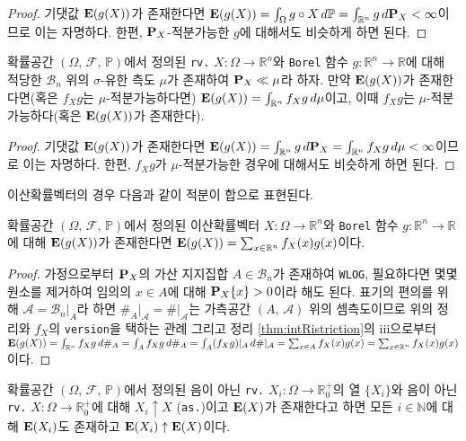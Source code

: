\begin{proof}
    기댓값 $\mathbf{E}(g(X))$가 존재한다면 $\mathbf{E}(g(X))=\int_\Omega g\circ X\,d\mathbb{P}=\int_{\mathbb{R}^n}g\,d\mathbf{P}_X<\infty$이므로 이는 자명하다. 한편, $\mathbf{P}_X$-적분가능한 $g$에 대해서도 비슷하게 하면 된다.
\end{proof}

\begin{theorem}
    확률공간 $(\Omega,\,\mathcal{F},\,\mathbb{P})$에서 정의된 \texttt{rv.} $X:\Omega\to\mathbb{R}^n$와 \texttt{Borel} 함수 $g:\mathbb{R}^n\to\mathbb{R}$에 대해 적당한 $\mathcal{B}_n$ 위의 $\sigma$-유한 측도 $\mu$가 존재하여 $\mathbf{P}_X\ll\mu$라 하자. 만약 $\mathbf{E}(g(X))$가 존재한다면(혹은 $f_Xg$는 $\mu$-적분가능하다면) $\mathbf{E}(g(X))=\int_{\mathbb{R}^n}f_Xg\,d\mu$이고, 이때 $f_Xg$는 $\mu$-적분가능하다(혹은 $\mathbf{E}(g(X))$가 존재한다).
\end{theorem}

\begin{proof}
    기댓값 $\mathbf{E}(g(X))$가 존재한다면 $\mathbf{E}(g(X))=\int_{\mathbb{R}^n}g\,d\mathbf{P}_X=\int_{\mathbb{R}^n}f_Xg\,d\mu<\infty$이므로 이는 자명하다. 한편, $f_Xg$가 $\mu$-적분가능한 경우에 대해서도 비슷하게 하면 된다.
\end{proof}

이산확률벡터의 경우 다음과 같이 적분이 합으로 표현된다.

\begin{corollary}
    확률공간 $(\Omega,\,\mathcal{F},\,\mathbb{P})$에서 정의된 이산확률벡터 $X:\Omega\to\mathbb{R}^n$와 \texttt{Borel} 함수 $g:\mathbb{R}^n\to\mathbb{R}$에 대해 $\mathbf{E}(g(X))$가 존재한다면 $\mathbf{E}(g(X))=\sum_{x\in\mathbb{R}^n}f_X(x)g(x)$이다.
\end{corollary}

\begin{proof}
    가정으로부터 $\mathbf{P}_X$의 가산 지지집합 $A\in\mathcal{B}_n$가 존재하여 \texttt{WLOG}, 필요하다면 몇몇 원소를 제거하여 임의의 $x\in A$에 대해 $\mathbf{P}_X\{x\}>0$이라 해도 된다. 표기의 편의를 위해 $\mathcal{A}=\mathcal{B}_n\vert_A$라 하면 $\#_A\vert_\mathcal{A}=\#\vert_\mathcal{A}$는 가측공간 $(A,\,\mathcal{A})$ 위의 셈측도이므로 위의 정리와 $f_X$의 \texttt{version}을 택하는 관례 그리고 정리 \ref{thm:intRistriction}의 iii으로부터 $\mathbf{E}(g(X))=\int_{\mathbb{R}^n}f_Xg\,d\#_A=\int_Af_Xg\,d\#_A=\int_A(f_Xg)\vert_A\,d\#\vert_\mathcal{A}=\sum_{x\in A}f_X(x)g(x)=\sum_{x\in\mathbb{R}^n}f_X(x)g(x)$이다.
\end{proof}

\begin{theorem}
    확률공간 $(\Omega,\,\mathcal{F},\,\mathbb{P})$에서 정의된 음이 아닌 \texttt{rv.} $X_i:\Omega\to\mathbb{R}^+_0$의 열 $\{X_i\}$와 음이 아닌 \texttt{rv.} $X:\Omega\to\mathbb{R}^+_0$에 대해 $X_i\uparrow X$ (\texttt{as.})이고 $\mathbf{E}(X)$가 존재한다고 하면 모든 $i\in\mathbb{N}$에 대해 $\mathbf{E}(X_i)$도 존재하고 $\mathbf{E}(X_i)\uparrow\mathbf{E}(X)$이다.
\end{theorem}

